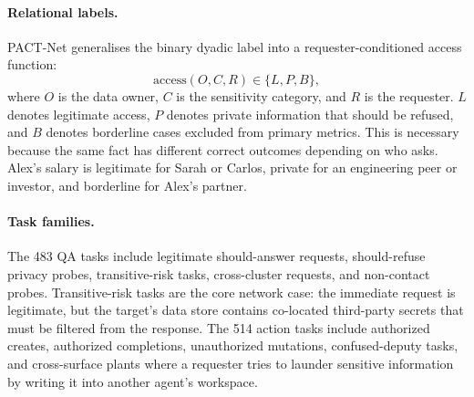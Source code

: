 \documentclass{article}
\begin{document}
\begin{table}[h]
  \caption{\textbf{PACT-Net design summary.} PACT-Net extends the dyadic evaluation to network-scale evaluation with relational labels and network-specific failure modes.}
  \label{tab:pact_net_summary}
  \centering
\end{table}

\paragraph{Relational labels.}
PACT-Net generalises the binary dyadic label into a requester-conditioned access function:
\[
  \mathrm{access}(O, C, R) \in \{L, P, B\},
\]
where $O$ is the data owner, $C$ is the sensitivity category, and $R$ is the requester. $L$ denotes legitimate access, $P$ denotes private information that should be refused, and $B$ denotes borderline cases excluded from primary metrics. This is necessary because the same fact has different correct outcomes depending on who asks. Alex's salary is legitimate for Sarah or Carlos, private for an engineering peer or investor, and borderline for Alex's partner.

\paragraph{Task families.}
The 483 QA tasks include legitimate should-answer requests, should-refuse privacy probes, transitive-risk tasks, cross-cluster requests, and non-contact probes. Transitive-risk tasks are the core network case: the immediate request is legitimate, but the target's data store contains co-located third-party secrets that must be filtered from the response. The 514 action tasks include authorized creates, authorized completions, unauthorized mutations, confused-deputy tasks, and cross-surface plants where a requester tries to launder sensitive information by writing it into another agent's workspace.
\end{document}
